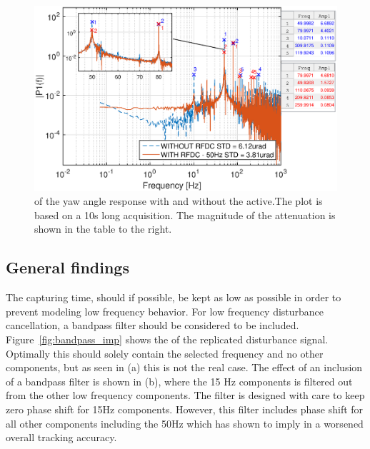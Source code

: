 \begin{figure}[h]
  \centering %
  \includegraphics[width=1\textwidth]{fig/matlab/mult_50_selected_closed_loop}
  \caption{\label{fig:mult50no80}\abbrFFT of the yaw angle response with and without the \abbrRFDC active.The plot is based on a 10s long acquisition. The magnitude of the attenuation is shown in the table to the right.}
\end{figure}

\FloatBarrier
\subsection{General findings}\label{subsec:longterm}
The capturing time, should if possible, be kept as low as possible in order to prevent modeling low frequency behavior. For low frequency disturbance cancellation, a bandpass filter should be considered to be included. Figure~\ref{fig:bandpass_imp} shows the \abbrFFT of the replicated disturbance signal. Optimally this should solely contain the selected frequency and no other components, but as seen in (a) this is not the real case. The effect of an inclusion of a bandpass filter is shown in (b), where the 15 Hz components is filtered out from the other low frequency components. The filter is designed with care to keep zero phase shift for 15Hz components. However, this filter includes phase shift for all other components including the 50Hz which has shown to imply in a worsened overall tracking accuracy.

